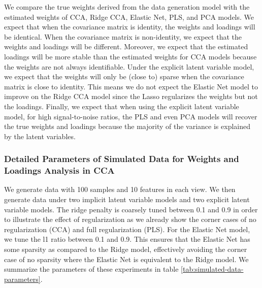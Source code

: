 We compare the true weights derived from the data generation model with the estimated weights of CCA, Ridge CCA, Elastic Net, PLS, and PCA models.
We expect that when the covariance matrix is identity, the weights and \gls{loadings} will be identical.
When the covariance matrix is non-identity, we expect that the weights and \gls{loadings} will be different.
Moreover, we expect that the estimated loadings will be more stable than the estimated weights for CCA models because the weights are not always identifiable.
Under the explicit latent variable model, we expect that the weights will only be (close to) sparse when the covariance matrix is close to identity.
This means we do not expect the Elastic Net model to improve on the Ridge CCA model since the Lasso regularizes the weights but not the \gls{loadings}.
Finally, we expect that when using the explicit latent variable model, for high signal-to-noise ratios, the PLS and even PCA models will recover the true weights and \gls{loadings} because the majority of the variance is explained by the latent variables.

\subsubsection{Detailed Parameters of Simulated Data for Weights and Loadings Analysis in CCA} We generate data with 100 samples and 10 features in each view.
We then generate data under two implicit latent variable models and two explicit latent variable models.
The ridge penalty is coarsely tuned between 0.1 and 0.9 in order to illustrate the effect of regularization as we already show the corner cases of no regularization (CCA) and full regularization (PLS).
For the Elastic Net model, we tune the l1 ratio between 0.1 and 0.9. This ensures that the Elastic Net has some sparsity as compared to the Ridge model, effectively avoiding the corner case of no sparsity where the Elastic Net is equivalent to the Ridge model.
We summarize the parameters of these experiments in table \ref{tab:simulated-data-parameters}.

